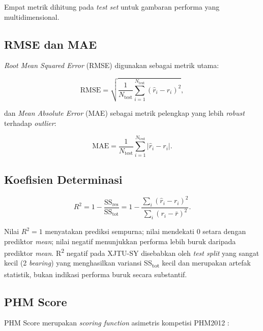 Empat metrik dihitung pada \emph{test set} untuk gambaran performa
yang multidimensional.

\subsection{RMSE dan MAE}
\label{subsec:bab4_rmse_mae}

\emph{Root Mean Squared Error} (RMSE) digunakan sebagai metrik utama:

\begin{equation}\label{eq:bab4_rmse}
\text{RMSE} = \sqrt{\frac{1}{N_{\text{test}}}\sum_{i=1}^{N_{\text{test}}} \left(\hat{r}_{i} - r_{i}\right)^{2}},
\end{equation}

\noindent dan \emph{Mean Absolute Error} (MAE) sebagai metrik pelengkap
yang lebih \emph{robust} terhadap \emph{outlier}:

\begin{equation}\label{eq:bab4_mae}
\text{MAE} = \frac{1}{N_{\text{test}}}\sum_{i=1}^{N_{\text{test}}} \left|\hat{r}_{i} - r_{i}\right|.
\end{equation}

\subsection{Koefisien Determinasi}
\label{subsec:bab4_r2}

\begin{equation}\label{eq:bab4_r2}
R^{2} = 1 - \frac{\text{SS}_{\text{res}}}{\text{SS}_{\text{tot}}}
      = 1 - \frac{\sum_{i}(\hat{r}_i - r_i)^2}{\sum_{i}(r_i - \bar{r})^2}.
\end{equation}

Nilai $R^{2} = 1$ menyatakan prediksi sempurna; nilai mendekati 0 setara
dengan prediktor \emph{mean}; nilai negatif menunjukkan performa lebih
buruk daripada prediktor \emph{mean}.
R\textsuperscript{2} negatif pada XJTU-SY disebabkan oleh \emph{test
split} yang sangat kecil (2 \emph{bearing}) yang menghasilkan variansi
SS\textsubscript{tot} kecil dan merupakan artefak statistik, bukan
indikasi performa buruk secara substantif.

\subsection{PHM Score}
\label{subsec:bab4_phmscore}

PHM Score merupakan \emph{scoring function} asimetris kompetisi
PHM2012 :

